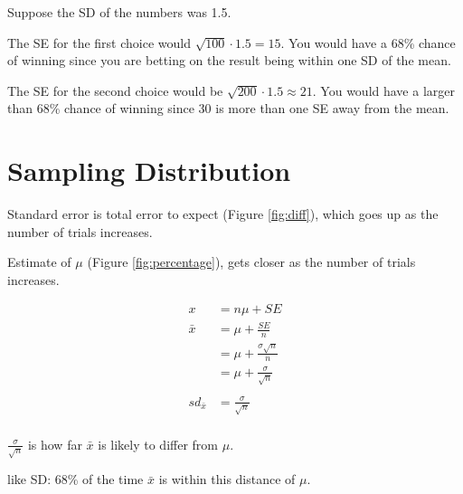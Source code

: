 \documentclass[portrait]{exam}
\begin{document}
\begin{enumerate}
\begin{solution}

        Suppose the SD of the numbers was 1.5.
        
        The SE for the first choice would $\sqrt{100} \cdot 1.5 = 15$. You would
        have a 68\% chance of winning since you are betting on the result being
        within one SD of the mean. 
        
        The SE for the second choice would be $\sqrt{200} \cdot 1.5 \approx 21$.
        You would have a larger than 68\% chance of winning since 30 is more
        than one SE away from the mean.

      \end{solution}
  \end{enumerate}

  \section{Sampling Distribution}

  Standard error is total error to expect (Figure \ref{fig:diff}), which goes up
  as the number of trials increases.

  Estimate of $\mu$ (Figure \ref{fig:percentage}), gets closer
  as the number of trials increases.

  \begin{align*}
    x            & = n \mu + SE \\
    \bar{x}      & = \mu + \frac{SE}{n} \\
                 & = \mu + \frac{\sigma \sqrt{n}}{n} \\
                 & = \mu + \frac{\sigma}{\sqrt{n}} \\
    \\
    sd_{\bar{x}} & = \frac{\sigma}{\sqrt{n}} \\
  \end{align*}

  \begin{itemize*}
    \item $\frac{\sigma}{\sqrt{n}}$ is how far $\bar{x}$ is likely to differ
      from $\mu$.
    \item like SD: 68\% of the time $\bar{x}$ is within this distance of
      $\mu$.
  \end{itemize*}
\end{document}
